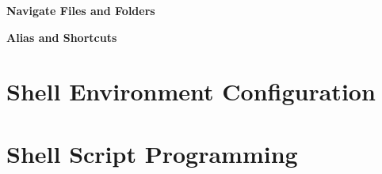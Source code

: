 \vspace{0.1in}
\noindent \textbf{Navigate Files and Folders}
\vspace{0.1in}



\vspace{0.1in}
\noindent \textbf{Alias and Shortcuts}
\vspace{0.1in}

\section{Shell Environment Configuration}


\section{Shell Script Programming}













